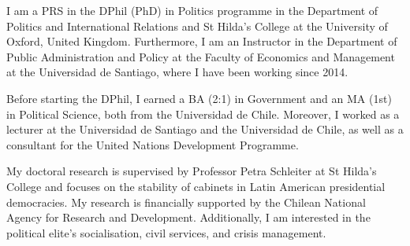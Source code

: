 




\vspace{3mm}

\begin{cvparagraph}

I am a PRS in the DPhil (PhD) in Politics programme in the Department of Politics and International Relations and St Hilda’s College at the University of Oxford, United Kingdom. Furthermore, I am an Instructor in the Department of Public Administration and Policy at the Faculty of Economics and Management at the Universidad de Santiago, where I have been working since 2014.

Before starting the DPhil, I earned a BA (2:1) in Government and an MA (1st) in Political Science, both from the Universidad de Chile. Moreover, I worked as a lecturer at the Universidad de Santiago and the Universidad de Chile, as well as a consultant for the United Nations Development Programme.

My doctoral research is supervised by Professor Petra Schleiter at St Hilda’s College and focuses on the stability of cabinets in Latin American presidential democracies. My research is financially supported by the Chilean National Agency for Research and Development. Additionally, I am interested in the political elite’s socialisation, civil services, and crisis management.
\vspace{1mm}
\end{cvparagraph}

